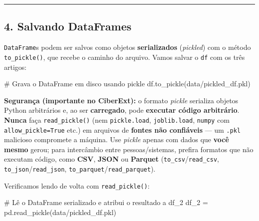 \documentclass[
  brazilian,
  11pt,
]{article}
\newenvironment{Shaded}{\begin{snugshade}}{\end{snugshade}}
\newcommand{\CommentTok}[1]{\textcolor[rgb]{0.48,0.49,0.49}{#1}}
\newcommand{\NormalTok}[1]{\textcolor[rgb]{0.81,0.81,0.76}{#1}}
\newcommand{\OperatorTok}[1]{\textcolor[rgb]{0.81,0.81,0.76}{#1}}
\newcommand{\StringTok}[1]{\textcolor[rgb]{0.96,0.31,0.31}{#1}}
\let\oldtexttt\texttt
\renewcommand{\texttt}[1]{{\color{inlink}\oldtexttt{#1}}}
\begin{document}
\begin{center}\rule{0.5\linewidth}{0.5pt}\end{center}

\subsection{4. Salvando DataFrames}\label{salvando-dataframes}

\texttt{DataFrame}s podem ser salvos como objetos \textbf{serializados}
(\emph{pickled}) com o método \texttt{to\_pickle()}, que recebe o
caminho do arquivo. Vamos salvar o \texttt{df} com os três artigos:

\begin{Shaded}
\begin{Highlighting}[]
\CommentTok{\# Grava o DataFrame em disco usando pickle}
\NormalTok{df.to\_pickle(}\StringTok{\textquotesingle{}data/pickled\_df.pkl\textquotesingle{}}\NormalTok{)}
\end{Highlighting}
\end{Shaded}

\begin{warnbox}

\textbf{Segurança (importante no CiberExt):} o formato \emph{pickle}
serializa objetos Python arbitrários e, ao ser \textbf{carregado}, pode
\textbf{executar código arbitrário}. \textbf{Nunca} faça
\texttt{read\_pickle()} (nem \texttt{pickle.load}, \texttt{joblib.load},
\texttt{numpy} com \texttt{allow\_pickle=True} etc.) em arquivos de
\textbf{fontes não confiáveis} --- um \texttt{.pkl} malicioso compromete
a máquina. Use \emph{pickle} apenas com dados que \textbf{você mesmo}
gerou; para intercâmbio entre pessoas/sistemas, prefira formatos que não
executam código, como \textbf{CSV}, \textbf{JSON} ou \textbf{Parquet}
(\texttt{to\_csv}/\texttt{read\_csv},
\texttt{to\_json}/\texttt{read\_json},
\texttt{to\_parquet}/\texttt{read\_parquet}).

\end{warnbox}

Verificamos lendo de volta com \texttt{read\_pickle()}:

\begin{Shaded}
\begin{Highlighting}[]
\CommentTok{\# Lê o DataFrame serializado e atribui o resultado a \textquotesingle{}df\_2\textquotesingle{}}
\NormalTok{df\_2 }\OperatorTok{=}\NormalTok{ pd.read\_pickle(}\StringTok{\textquotesingle{}data/pickled\_df.pkl\textquotesingle{}}\NormalTok{)}
\end{Highlighting}
\end{Shaded}
\end{document}

